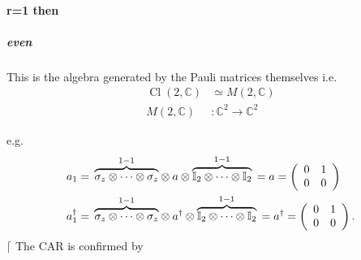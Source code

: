 \documentclass[aps,preprint]{revtex4}%
\begin{document}
\paragraph{r=1 then}

\subparagraph{ even}

This is the algebra generated by the Pauli matrices themselves i.e.%
\begin{align}
\operatorname*{Cl}\left(  2,\mathbb{C}\right)   &  \simeq M\left(
2,\mathbb{C}\right) \\
M\left(  2,\mathbb{C}\right)   &  :\mathbb{C}^{2}\rightarrow\mathbb{C}^{2}%
\end{align}


e.g.
\begin{align}
a_{1}  &  =\,\overset{1-1}{\overbrace{\mathbb{\sigma}_{z}\otimes\cdots
\otimes\mathbb{\sigma}_{z}}}\otimes a\otimes
\overset{1-1}{\overbrace{\mathbb{I}_{2}\otimes\cdots\otimes\mathbb{I}_{2}}%
}\,=a=\left(
\begin{array}
[c]{cc}%
0 & 1\\
0 & 0
\end{array}
\right) \\
a_{1}^{\dagger}  &  =\,\overset{1-1}{\overbrace{\mathbb{\sigma}_{z}%
\otimes\cdots\otimes\mathbb{\sigma}_{z}}}\otimes a^{\dagger}\otimes
\overset{1-1}{\overbrace{\mathbb{I}_{2}\otimes\cdots\otimes\mathbb{I}_{2}}%
}\,=a^{\dagger}=\left(
\begin{array}
[c]{cc}%
0 & 1\\
0 & 0
\end{array}
\right)  .
\end{align}
$\lceil$ The CAR is confirmed by%
\end{document}
